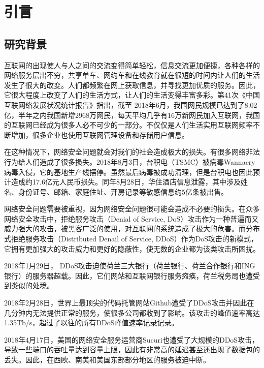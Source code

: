 \chapter{引言}
\label{cha:intro}

\section{研究背景}
\label{sec:background}
互联网的出现使人与人之间的交流变得简单轻松，信息交流更加便捷，各种各样的网络服务层出不穷，共享单车、网约车和在线教育就在很短的时间内让人们的生活发生了很大的改变。人们都频繁在网上获取信息，并寻找更加优质的服务。因此，它很大程度上改变了人们的生活方式，让人们的生活变得丰富多彩。第41次《中国互联网络发展状况统计报告》\cite{networkreport}指出，截至 2018年6月，我国网民规模已达到了8.02亿，半年之内我国新增2968万网民，每天平均几乎有16万新网民加入互联网，我国的互联网已经成为很多人必不可少的一部分。不仅仅是人们生活实用互联网频率不断增加，很多企业也使用互联网管理设备和存储用户信息。

在这种情况下，网络安全问题就会对我们的社会造成极大的损失。有很多网络非法行为给人们造成了很多损失。2018年8月3日，台积电（TSMC）被病毒Wannacry病毒入侵，它的基地生产线摆停。虽然最后病毒被成功清理，但是台积电也因此预计造成约17.6亿元人民币损失。同年8月28日，华住酒店信息泄露，其中涉及姓名、身份证号、邮箱、家庭住址、开房记录等敏感信息约5亿条被出售。

网络安全问题需要被重视，因为网络安全问题很可能会造成不必要的损失。在众多网络安全攻击中，拒绝服务攻击（Denial of Service, DoS）攻击作为一种普遍而又威力强大的攻击，被黑客广泛的使用，对互联网的系统造成了极大的危害。而分布式拒绝服务攻击（Distributed Denail of Service, DDoS）作为DoS攻击的新模式，它拥有更加强大的攻击威力和更好的隐蔽性，使无数的企业都为该类攻击所困扰。


2018年1月29日， DDoS攻击迫使荷兰三大银行（荷兰银行、荷兰合作银行和ING银行）的服务器超载。因此，它们网站和互联网银行服务瘫痪，荷兰税务局也遭受到类似的处境。

2018年2月28日，世界上最顶尖的代码托管网站Github遭受了DDoS攻击并因此在几分钟内无法提供正常的服务，使很多公司都收到了影响。该攻击的峰值速率高达1.35Tb/s，超过了以往的所有DDoS峰值速率记录记录。

2018年4月17日，美国的网络安全服务运营商Sucuri也遭受了大规模的DDoS攻击，导致一些端口的吞吐量达到容量上限，因此有非常高的延迟甚至还出现了数据包的丢失。因此，在西欧、南美和美国东部部分地区的服务被迫中断。

